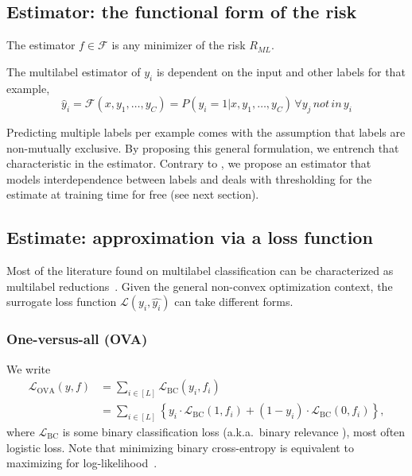 \subsection{Estimator: the functional form of the risk}
\label{section:background:estimator}

The estimator $f \in \mathcal{F}$ is any minimizer of the risk $R_{ML}$. 

\begin{proposition}
  The multilabel estimator of $y_i$ is dependent on the input and other labels for that example,
%
\begin{equation}
  \hat{y}_i = \mathcal{F}(x, y_1, \ldots, y_C) = P(y_i = 1 | x, y_1, \ldots, y_C) \, \forall y_j \, not \, in \, y_i
\end{equation}
\label{eq:estimand}
\end{proposition}
%
Predicting multiple labels per example comes with the assumption that labels are non-mutually exclusive. By proposing this general formulation, we entrench that characteristic in the estimator. Contrary to \citet{multilabelReduction}, we propose an estimator that models interdependence between labels and deals with thresholding for the estimate at training time for free (see next section).


\subsection{Estimate: approximation via a loss function}
\label{section:background:estimate}


Most of the literature found on multilabel classification can be characterized as multilabel reductions~\cite{multilabelReduction}. Given the general non-convex optimization context, the surrogate loss function $\mathcal{L}(y_i, \hat{y_i})$ can take different forms. 

\subsubsection*{One-versus-all (OVA)}
We write
%
\begin{equation}
\begin{aligned}
\mathcal{L}_{\mathrm{OVA}}(y, f) &= \sum_{i \in[L]} \mathcal{L}_{\mathrm{BC}}\left(y_{i}, f_{i}\right)\\
&=\sum_{i \in[L]}\left\{y_{i} \cdot \mathcal{L}_{\mathrm{BC}}\left(1, f_{i}\right)+\left(1-y_{i}\right) \cdot \mathcal{L}_{\mathrm{BC}}\left(0, f_{i}\right)\right\},
\end{aligned}
\end{equation}
%
where $\mathcal{L}_{\mathrm{BC}}$ is some binary classification loss (a.k.a.\ binary relevance \cite{OVA1, hammingLoss, OVA2}), most often logistic loss.  Note that minimizing binary cross-entropy is equivalent to maximizing for log-likelihood~\cite[Section 4.3.4]{Bishop}.

